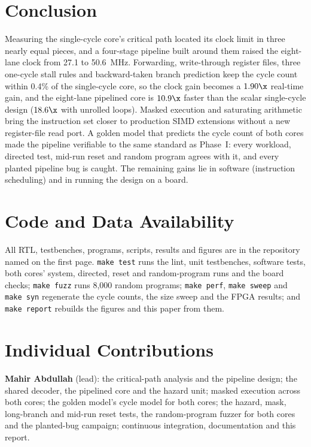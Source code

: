 \section{Conclusion}\label{sec:conclusion}
Measuring the single-cycle core's critical path located its clock limit in three nearly
equal pieces, and a four-stage pipeline built around them raised the eight-lane clock
from 27.1 to 50.6~MHz. Forwarding, write-through register files, three one-cycle stall
rules and backward-taken branch prediction keep the cycle count within 0.4\% of the
single-cycle core, so the clock gain becomes a $1.90\x$ real-time gain, and the eight-lane
pipelined core is $10.9\x$ faster than the scalar single-cycle design ($18.6\x$ with
unrolled loops). Masked execution and saturating arithmetic bring the instruction set
closer to production SIMD extensions without a new register-file read port. A golden
model that predicts the cycle count of both cores made the pipeline verifiable to the
same standard as Phase~I: every workload, directed test, mid-run reset and random
program agrees with it, and every planted pipeline bug is caught. The remaining gains
lie in software (instruction scheduling) and in running the design on a board.

\section*{Code and Data Availability}
All RTL, testbenches, programs, scripts, results and figures are in the repository
named on the first page. \texttt{make test} runs the lint, unit testbenches, software
tests, both cores' system, directed, reset and random-program runs and the board checks;
\texttt{make fuzz} runs 8,000 random programs; \texttt{make perf}, \texttt{make sweep}
and \texttt{make syn} regenerate the cycle counts, the size sweep and the FPGA results;
and \texttt{make report} rebuilds the figures and this paper from them.

\section*{Individual Contributions}
\textbf{Mahir Abdullah} (lead): the critical-path analysis and the pipeline design; the
shared decoder, the pipelined core and the hazard unit; masked execution across both
cores; the golden model's cycle model for both cores; the hazard, mask, long-branch and
mid-run reset tests, the random-program fuzzer for both cores and the planted-bug
campaign; continuous integration, documentation and this report.

